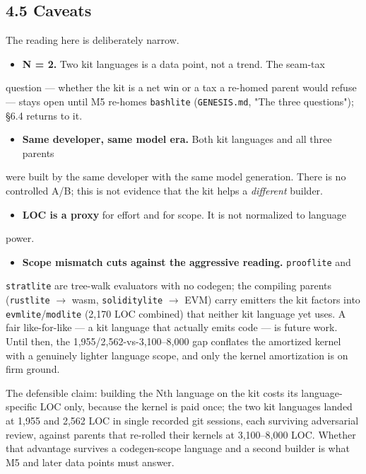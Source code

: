 \documentclass[11pt]{article}
\newcommand{\code}[1]{\texttt{#1}}
\begin{document}
\subsection*{4.5 Caveats}

The reading here is deliberately narrow.

\begin{itemize}[leftmargin=*]
\item \textbf{N = 2.} Two kit languages is a data point, not a trend. The seam-tax
\end{itemize}
  question --- whether the kit is a net win or a tax a re-homed parent would refuse
  --- stays open until M5 re-homes \code{bashlite} (\code{GENESIS.md}, "The three
  questions"); \S{}6.4 returns to it.
\begin{itemize}[leftmargin=*]
\item \textbf{Same developer, same model era.} Both kit languages and all three parents
\end{itemize}
  were built by the same developer with the same model generation. There is no
  controlled A/B; this is not evidence that the kit helps a \emph{different} builder.
\begin{itemize}[leftmargin=*]
\item \textbf{LOC is a proxy} for effort and for scope. It is not normalized to language
\end{itemize}
  power.
\begin{itemize}[leftmargin=*]
\item \textbf{Scope mismatch cuts against the aggressive reading.} \code{prooflite} and
\end{itemize}
  \code{stratlite} are tree-walk evaluators with no codegen; the compiling parents
  (\code{rustlite} $\rightarrow$ wasm, \code{soliditylite} $\rightarrow$ EVM) carry emitters the kit factors into
  \code{evmlite}/\code{modlite} (2,170 LOC combined) that neither kit language yet uses. A
  fair like-for-like --- a kit language that actually emits code --- is future work.
  Until then, the 1,955/2,562-vs-3,100--8,000 gap conflates the amortized kernel
  with a genuinely lighter language scope, and only the kernel amortization is
  on firm ground.

The defensible claim: building the Nth language on the kit costs its
language-specific LOC only, because the kernel is paid once; the two kit
languages landed at 1,955 and 2,562 LOC in single recorded git sessions, each
surviving adversarial review, against parents that re-rolled their kernels at
3,100--8,000 LOC. Whether that advantage survives a codegen-scope language and a
second builder is what M5 and later data points must answer.
\end{document}
